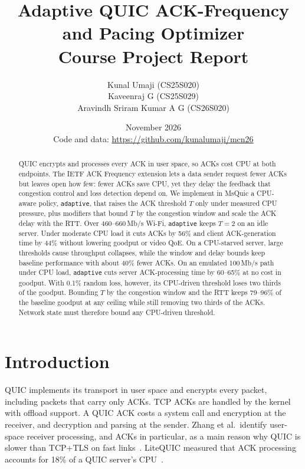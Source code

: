 \documentclass[11pt]{article}
\newcommand{\pol}[1]{\texttt{#1}}            %
\newcommand{\mbps}{\,Mb/s}
\begin{document}
\title{\textbf{Adaptive QUIC ACK-Frequency and Pacing Optimizer}\\ {\large Course Project Report}}
\author{Kunal Umaji (CS25S020)\\ Kaveenraj G (CS25S029)\\ Aravindh Sriram Kumar A G (CS26S020)}
\date{November 2026\\[0.4em] {\normalsize Code and data: \url{https://github.com/kunalumaji/mcn26}}}
\maketitle

\begin{abstract}
QUIC encrypts and processes every ACK in user space, so ACKs cost CPU at both endpoints. The IETF
ACK Frequency extension lets a data sender request fewer ACKs but leaves open how few: fewer ACKs
save CPU, yet they delay the feedback that congestion control and loss detection depend on. We
implement in MsQuic a CPU-aware policy, \pol{adaptive}, that raises the ACK threshold $T$ only
under measured CPU pressure, plus modifiers that bound $T$ by the congestion window and scale the
ACK delay with the RTT. Over 460--660\mbps{} Wi-Fi, \pol{adaptive} keeps $T{=}2$ on an idle
server. Under moderate CPU load it cuts ACKs by 56\% and client ACK-generation time by 44\% without
lowering goodput or video QoE. On a CPU-starved server, large thresholds cause throughput
collapses, while the window and delay bounds keep baseline performance with about 40\% fewer ACKs.
On an emulated 100\mbps{} path under CPU load, \pol{adaptive} cuts server ACK-processing time by
60--65\% at no cost in goodput. With 0.1\% random loss, however, its CPU-driven threshold loses two thirds of the goodput.
Bounding $T$ by the congestion window and the RTT keeps 79--96\% of the baseline goodput at any
ceiling while still removing two thirds of the ACKs. Network state must therefore bound any
CPU-driven threshold.
\end{abstract}

\section{Introduction}
QUIC implements its transport in user space and encrypts every packet, including packets that
carry only ACKs. TCP ACKs are handled by the kernel with offload support. A QUIC ACK costs a system
call and encryption at the receiver, and decryption and parsing at the sender. Zhang et al.\
identify user-space receiver processing, and ACKs in particular, as a main reason why QUIC is
slower than TCP+TLS on fast links~\cite{zhang2024quic}. LiteQUIC measured that ACK processing
accounts for 18\% of a QUIC server's CPU~\cite{bi2024litequic}.
\end{document}
